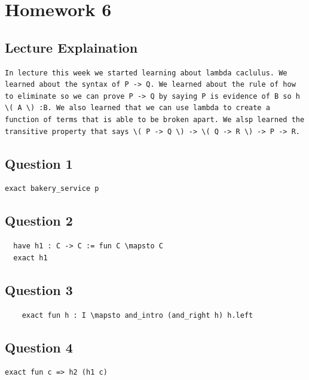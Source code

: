 \documentclass{article}
\theoremstyle{plain}
\theoremstyle{definition}
\theoremstyle{remark}
\begin{document}
\section{Homework 6}\label{homework6}

\subsection{Lecture Explaination}

\begin{lstlisting}
In lecture this week we started learning about lambda caclulus. We learned about the syntax of P -> Q. We learned about the rule of how to eliminate so we can prove P -> Q by saying P is evidence of B so h \( A \) :B. We also learned that we can use lambda to create a function of terms that is able to be broken apart. We alsp learned the transitive property that says \( P -> Q \) -> \( Q -> R \) -> P -> R.
\end{lstlisting}

\subsection{Question 1}

\begin{lstlisting}
exact bakery_service p
\end{lstlisting}

\subsection{Question 2}

\begin{lstlisting}
  have h1 : C -> C := fun C \mapsto C
  exact h1
  \end{lstlisting}
  
  \subsection{Question 3}
  
  \begin{lstlisting}
    exact fun h : I \mapsto and_intro (and_right h) h.left
    \end{lstlisting}


\subsection{Question 4}

\begin{lstlisting}
exact fun c => h2 (h1 c)
\end{lstlisting}
\end{document}
